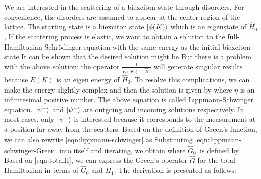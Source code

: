 We are interested in the scattering of a biexciton state through disorders. For convenience, the disorders are assumed
to appear at the center region of the lattice.  The starting state is a biexciton state $| \phi(K) \rangle$ which is an 
eigenstate of $\hat{H}_0$,
 If the scattering process is elastic, we want to obtain a solution to the
full-Hamiltonian Schr\"odinger equation with the same energy as the initial biexciton state
It can be shown that the desired solution might be
But there is a problem with the above solution: the operator $\frac{1}{E(K) - \hat{H}_0}$ will generate singular results
because $E(K)$ is an eigen energy of $\hat{H}_0$. To resolve this complications, we can make the energy slightly 
complex and then the solution is given by
where $\eta$ is an infinitesimal positive number. 
The above equation is called Lippmann-Schwinger equation. $| \psi^{+} \rangle$ and $| \psi^{-} \rangle$ are outgoing and
incoming solutions respectively. In most cases, only $| \psi^{+} \rangle$ is interested because it corresponds to the 
measurement at a position far away from the scatters. Based on the definition of Green's function, we can also
rewrite \autoref{eqn:lippmann-schwinger} as 
Substituting \autoref{eqn:lippmann-schwinger-Green} into itself and iterating, we obtain
where $\hat{G}_0^{+}$ is defined by
Based on \autoref{eqn:totalH}, we can express the Green's operator $\hat{G}$ for the total Hamiltonian in terms of
$\hat{G}_0$ and $H_1$. The derivation is presented as follows:
